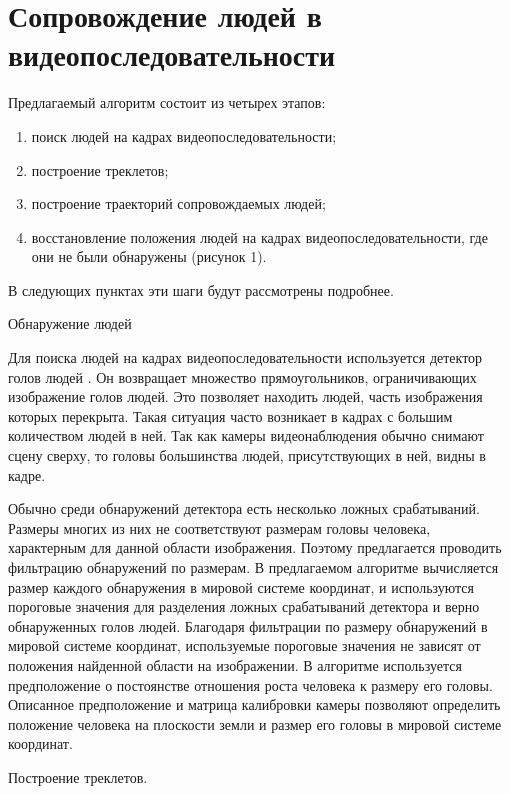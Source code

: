 \chapter{Сопровождение людей в видеопоследовательности} \label{chapt5}


Предлагаемый алгоритм состоит из четырех этапов:
\begin{enumerate}
	\item поиск людей на кадрах видеопоследовательности;
	\item построение треклетов;
	\item построение траекторий сопровождаемых людей;
	\item восстановление положения людей на кадрах видеопоследовательности, где они не были обнаружены (рисунок 1).
\end{enumerate}

В следующих пунктах эти шаги будут рассмотрены подробнее.

Обнаружение людей

Для поиска людей на кадрах видеопоследовательности используется детектор голов людей \cite{prisacariu_reid_tr2310_09}. Он возвращает множество прямоугольников, ограничивающих изображение голов людей. Это позволяет находить людей, часть изображения которых перекрыта. Такая ситуация часто возникает в кадрах с большим количеством людей в ней. Так как камеры видеонаблюдения обычно снимают сцену сверху, то головы большинства людей, присутствующих в ней, видны в кадре.

Обычно среди обнаружений детектора есть несколько ложных срабатываний. Размеры многих из них не соответствуют размерам головы человека, характерным для данной области изображения. Поэтому предлагается проводить фильтрацию обнаружений по размерам. В предлагаемом алгоритме вычисляется размер каждого обнаружения в мировой системе координат, и используются пороговые значения для разделения ложных срабатываний детектора и верно обнаруженных голов людей. Благодаря фильтрации по размеру обнаружений в мировой системе координат, используемые пороговые значения не зависят от положения найденной области на изображении. В алгоритме используется предположение о постоянстве отношения роста человека к размеру его головы. Описанное предположение и матрица калибровки камеры позволяют определить положение человека на плоскости земли и размер его головы в мировой системе координат.

Построение треклетов.

